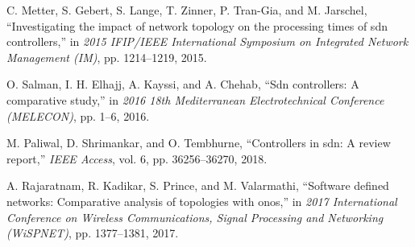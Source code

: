 \documentclass[12pt,a4paper]{article}
\begin{document}
	\begin{thebibliography}{9}
		C. Metter, S. Gebert, S. Lange, T. Zinner, P. Tran-Gia, and M. Jarschel,
		``Investigating the impact of network topology on the processing times of sdn controllers,'' in \textit{2015 IFIP/IEEE International Symposium on Integrated Network Management (IM)}, pp. 1214--1219, 2015.
		
		O. Salman, I. H. Elhajj, A. Kayssi, and A. Chehab, ``Sdn controllers: A comparative study,'' in \textit{2016 18th Mediterranean Electrotechnical Conference (MELECON)}, pp. 1--6, 2016.
		
		M. Paliwal, D. Shrimankar, and O. Tembhurne, ``Controllers in sdn: A review report,'' \textit{IEEE Access}, vol. 6, pp. 36256--36270, 2018.
		
		A. Rajaratnam, R. Kadikar, S. Prince, and M. Valarmathi, ``Software defined networks: Comparative analysis of topologies with onos,'' in \textit{2017 International Conference on Wireless Communications, Signal Processing and Networking (WiSPNET)}, pp. 1377--1381, 2017.
	\end{thebibliography}
	
\end{document}
